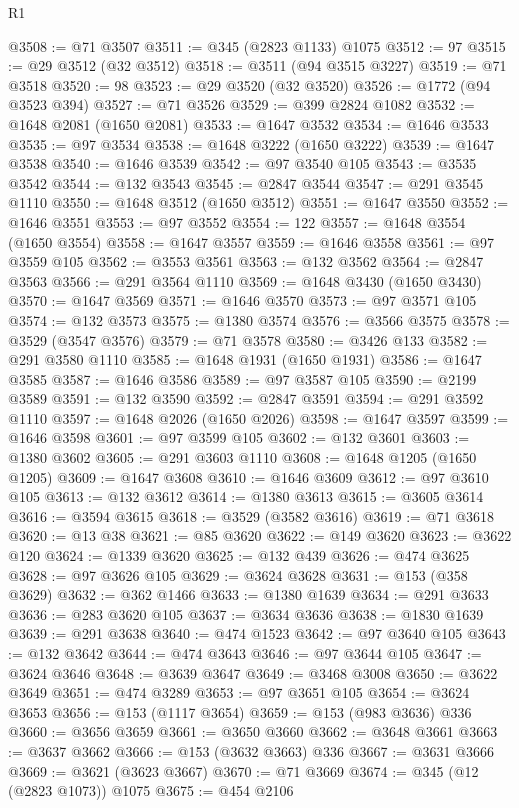 \begin{lexlean}{R1}
\begin{coremodule}
{{{{{{{{{{{{{{{{{{{{{{{{{{{{{{{{{{{{{{{{{{{{{{{{{{{{{{{{{{{{{{{{{{{{{{{{{{{{{{{{{{{{{{{{{{{{{{{{{{{{{{{{{{{{{{{{{{{{{{{{{{{{{{{{{{{{{{{{{{{{{{{{{{{{{{{{{{{{{{{{{{{{{{{{{{{{{{{{{{{{{{{{{{@3508 := @71 @3507
@3511 := @345 (@2823 @1133) @1075
@3512 := 97
@3515 := @29 @3512 (@32 @3512)
@3518 := @3511 (@94 @3515 @3227)
@3519 := @71 @3518
@3520 := 98
@3523 := @29 @3520 (@32 @3520)
@3526 := @1772 (@94 @3523 @394)
@3527 := @71 @3526
@3529 := @399 @2824 @1082
@3532 := @1648 @2081 (@1650 @2081)
@3533 := @1647 @3532
@3534 := @1646 @3533
@3535 := @97 @3534
@3538 := @1648 @3222 (@1650 @3222)
@3539 := @1647 @3538
@3540 := @1646 @3539
@3542 := @97 @3540 @105
@3543 := @3535 @3542
@3544 := @132 @3543
@3545 := @2847 @3544
@3547 := @291 @3545 @1110
@3550 := @1648 @3512 (@1650 @3512)
@3551 := @1647 @3550
@3552 := @1646 @3551
@3553 := @97 @3552
@3554 := 122
@3557 := @1648 @3554 (@1650 @3554)
@3558 := @1647 @3557
@3559 := @1646 @3558
@3561 := @97 @3559 @105
@3562 := @3553 @3561
@3563 := @132 @3562
@3564 := @2847 @3563
@3566 := @291 @3564 @1110
@3569 := @1648 @3430 (@1650 @3430)
@3570 := @1647 @3569
@3571 := @1646 @3570
@3573 := @97 @3571 @105
@3574 := @132 @3573
@3575 := @1380 @3574
@3576 := @3566 @3575
@3578 := @3529 (@3547 @3576)
@3579 := @71 @3578
@3580 := @3426 @133
@3582 := @291 @3580 @1110
@3585 := @1648 @1931 (@1650 @1931)
@3586 := @1647 @3585
@3587 := @1646 @3586
@3589 := @97 @3587 @105
@3590 := @2199 @3589
@3591 := @132 @3590
@3592 := @2847 @3591
@3594 := @291 @3592 @1110
@3597 := @1648 @2026 (@1650 @2026)
@3598 := @1647 @3597
@3599 := @1646 @3598
@3601 := @97 @3599 @105
@3602 := @132 @3601
@3603 := @1380 @3602
@3605 := @291 @3603 @1110
@3608 := @1648 @1205 (@1650 @1205)
@3609 := @1647 @3608
@3610 := @1646 @3609
@3612 := @97 @3610 @105
@3613 := @132 @3612
@3614 := @1380 @3613
@3615 := @3605 @3614
@3616 := @3594 @3615
@3618 := @3529 (@3582 @3616)
@3619 := @71 @3618
@3620 := @13 @38
@3621 := @85 @3620
@3622 := @149 @3620
@3623 := @3622 @120
@3624 := @1339 @3620
@3625 := @132 @439
@3626 := @474 @3625
@3628 := @97 @3626 @105
@3629 := @3624 @3628
@3631 := @153 (@358 @3629)
@3632 := @362 @1466
@3633 := @1380 @1639
@3634 := @291 @3633
@3636 := @283 @3620 @105
@3637 := @3634 @3636
@3638 := @1830 @1639
@3639 := @291 @3638
@3640 := @474 @1523
@3642 := @97 @3640 @105
@3643 := @132 @3642
@3644 := @474 @3643
@3646 := @97 @3644 @105
@3647 := @3624 @3646
@3648 := @3639 @3647
@3649 := @3468 @3008
@3650 := @3622 @3649
@3651 := @474 @3289
@3653 := @97 @3651 @105
@3654 := @3624 @3653
@3656 := @153 (@1117 @3654)
@3659 := @153 (@983 @3636) @336
@3660 := @3656 @3659
@3661 := @3650 @3660
@3662 := @3648 @3661
@3663 := @3637 @3662
@3666 := @153 (@3632 @3663) @336
@3667 := @3631 @3666
@3669 := @3621 (@3623 @3667)
@3670 := @71 @3669
@3674 := @345 (@12 (@2823 @1073)) @1075
@3675 := @454 @2106
}}}}}}}}}}}}}}}}}}}}}}}}}}}}}}}}}}}}}}}}}}}}}}}}}}}}}}}}}}}}}}}}}}}}}}}}}}}}}}}}}}}}}}}}}}}}}}}}}}}}}}}}}}}}}}}}}}}}}}}}}}}}}}}}}}}}}}}}}}}}}}}}}}}}}}}}}}}}}}}}}}}}}}}}}}}}}}}}}}}}}}}}}}
\end{coremodule}
\end{lexlean}
